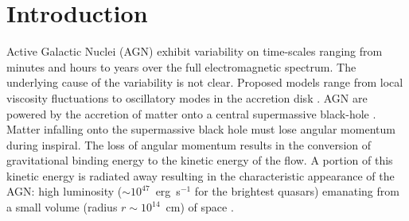 \documentclass[a4paper,fleqn,usenatbib]{mnras}
\begin{document}


\section[Introduction]{Introduction}\label{sec:Introduction}

Active Galactic Nuclei (AGN) exhibit variability on time-scales ranging from minutes and hours to years over the full electromagnetic spectrum. The underlying cause of the variability is not clear. Proposed models range from local viscosity fluctuations to oscillatory modes in the accretion disk \citep{UrryARAA}. AGN are powered by the accretion of matter onto a central supermassive black-hole \citep{ReesARAA}. Matter infalling onto the supermassive black hole must lose angular momentum during inspiral. The loss of angular momentum results in the conversion of gravitational binding energy to the kinetic energy of the flow. A portion of this kinetic energy is radiated away resulting in the characteristic appearance of the AGN: high luminosity ($\sim 10^{47}$~erg~s$^{-1}$ for the brightest quasars) emanating from a small volume (radius $r \sim 10^{14}$~cm) of space \citep{Edelson96}.
\end{document}
